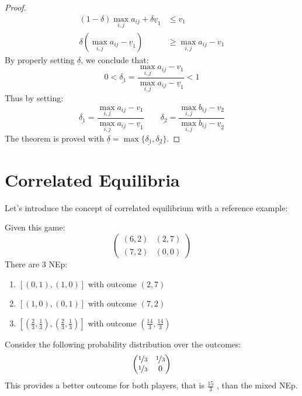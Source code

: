 \documentclass[../main.tex]{subfiles}
\begin{document}
\begin{proof}
\begin{align*}
        (1-\delta)\max_{i,j} a_{ij} + \delta \underline{v}_1                                 & \leq v_1                     \\
        \delta(\max_{i,j} a_{ij} - \underline{v}_1)                                          & \geq \max_{i,j} a_{ij} - v_1
    \end{align*}
    By properly setting $\underline{\delta}$, we conclude that:
    \begin{equation*}
        0 < \underline{\delta_1} = \frac{\max_{i,j} a_{ij} - v_1}{\max_{i,j} a_{ij} - \underline{v}_1} < 1
    \end{equation*}
    Thus by setting:
    \begin{equation*}
        \underline{\delta_1} = \frac{\max_{i,j} a_{ij} - v_1}{\max_{i,j} a_{ij} - \underline{v}_1} \qquad \underline{\delta_2} = \frac{\max_{i,j} b_{ij} - v_2}{\max_{i,j} b_{ij} - \underline{v}_2}
    \end{equation*}
    The theorem is proved with $\underline{\delta} = \max \{ \underline{\delta_1}, \underline{\delta_2} \}$.
\end{proof}

\section{Correlated Equilibria}

Let's introduce the concept of correlated equilibrium with a reference example:
\begin{example} Given this game:
    \[
        \begin{pmatrix}
            (6,2) & (2,7) \\
            (7,2) & (0,0)
        \end{pmatrix}
    \]
    There are 3 \gls{NEp}:
    \begin{enumerate}
        \item $[(0,1), (1,0)]$ with outcome $(2,7)$
        \item $[(1,0), (0,1)]$ with outcome $(7,2)$
        \item $\left[\left(\frac{2}{3}, \frac{1}{3}\right), \left(\frac{2}{3},\frac{1}{3}\right)\right]$ with outcome $\left(\frac{14}{3}, \frac{14}{3}\right)$
    \end{enumerate}
\end{example}

Consider the following probability distribution over the outcomes:
\[
    \begin{pmatrix}
        \nicefrac{1}{3} & \nicefrac{1}{3} \\
        \nicefrac{1}{3} & 0
    \end{pmatrix}
\]
This provides a better outcome for both players, that is $\frac{15}{3}$ , than the mixed \gls{NEp}.
\end{document}
